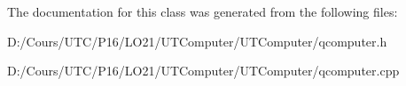 The documentation for this class was generated from the following files\+:\begin{DoxyCompactItemize}
\item 
D\+:/\+Cours/\+U\+T\+C/\+P16/\+L\+O21/\+U\+T\+Computer/\+U\+T\+Computer/qcomputer.\+h\item 
D\+:/\+Cours/\+U\+T\+C/\+P16/\+L\+O21/\+U\+T\+Computer/\+U\+T\+Computer/qcomputer.\+cpp\end{DoxyCompactItemize}
